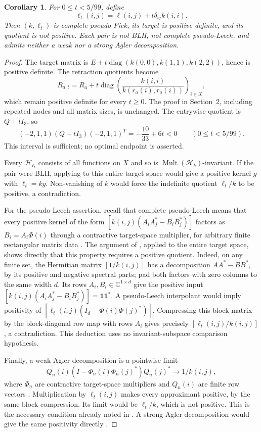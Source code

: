 \documentclass[11pt]{article}
\newtheorem{corollary}[theorem]{Corollary}
\newcommand{\HH}{\mathcal H}
\newcommand{\Mult}{\operatorname{Mult}}
\newcommand{\diag}{\operatorname{diag}}
\begin{document}
\begin{corollary}\label{cor:family}
For $0\leq t<5/99$, define
\[
 \ell_t(i,j)=\ell(i,j)+t\delta_{ij}k(i,i).
\]
Then $(k,\ell_t)$ is complete pseudo-Pick, its target is positive
definite, and its quotient is not positive. Each pair is not BLH,
not complete pseudo-Leech, and admits neither a weak nor a strong
Agler decomposition.
\end{corollary}
\begin{proof}
The target matrix is $E+t\diag(k(0,0),k(1,1),k(2,2))$, hence is
positive definite. The retraction quotients become
\[
 R_{a,t}=R_a+t\diag\left(
 \frac{k(i,i)}{k(r_a(i),r_a(i))}\right)_{i\in X},
\]
which remain positive definite for every $t\geq0$. The proof in
Section~2, including repeated nodes and all matrix sizes, is unchanged.
The entrywise quotient is $Q+tI_3$, so
\[
 (-2,1,1)(Q+tI_3)(-2,1,1)^T=-\frac{10}{33}+6t<0
 \qquad (0\leq t<5/99).
\]
This interval is sufficient; no optimal endpoint is asserted.

Every $\HH_{\ell_t}$ consists of all functions on $X$ and so is
$\Mult(\HH_k)$-invariant. If the pair were BLH, applying
\cite[Proposition 3.1]{LMT} to this entire target space would give a
positive kernel $g$ with $\ell_t=kg$. Non-vanishing of $k$ would force
the indefinite quotient $\ell_t/k$ to be positive, a contradiction.

For the pseudo-Leech assertion, recall that complete pseudo-Leech means
that every positive kernel of the form
$[k(i,j)(A_iA_j^*-B_iB_j^*)]$ factors as
$B_i=A_i\Phi(i)$ through a contractive target-space multiplier, for
arbitrary finite rectangular matrix data
\cite[Definition 4.1, pp.~23--24]{LMT}.
The argument of \cite[Proposition 4.3]{LMT}, applied to the entire target
space, shows directly that this property requires a positive quotient.
Indeed, on any finite set, the Hermitian matrix $[1/k(i,j)]$ has a
decomposition $AA^*-BB^*$, by its positive and negative spectral parts;
pad both factors with zero columns to the same width $d$.
Its rows $A_i,B_i\in\mathbb C^{1\times d}$ give the positive input
$[k(i,j)(A_iA_j^*-B_iB_j^*)]=\mathbf1\mathbf1^*$.
A pseudo-Leech interpolant would imply positivity of
$[\ell_t(i,j)(I_d-\Phi(i)\Phi(j)^*)]$.
Compressing this block matrix by the block-diagonal row map with rows
$A_i$ gives precisely $[\ell_t(i,j)/k(i,j)]$, a contradiction.
This deduction uses no invariant-subspace comparison hypothesis.

Finally, a weak Agler decomposition is a pointwise limit
\[
 Q_n(i)(I-\Phi_n(i)\Phi_n(j)^*)Q_n(j)^*
       \longrightarrow 1/k(i,j),
\]
where $\Phi_n$ are contractive target-space multipliers and $Q_n(i)$
are finite row vectors \cite[Definition 3.13]{LMT}.
Multiplication by $\ell_t(i,j)$ makes every approximant positive,
by the same block compression. Its limit would be $\ell_t/k$,
which is not positive. This is the necessary condition already noted
in \cite[Remark 3.14]{LMT}. A strong Agler decomposition would give
the same positivity directly \cite[Definition 3.17]{LMT}.
\end{proof}
\end{document}
